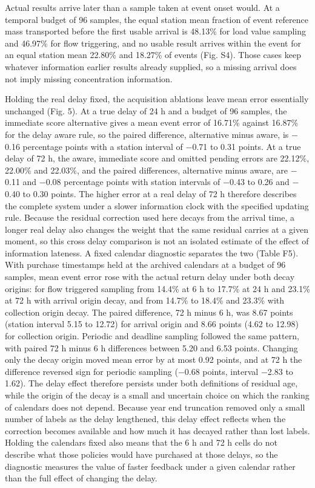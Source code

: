 \documentclass[lineno,pdflatex,sn-apa]{sn-jnl}%
\theoremstyle{thmstyleone}%
\theoremstyle{thmstyletwo}%
\theoremstyle{thmstylethree}%
\begin{document}
Actual results arrive later than a sample taken at event onset would. At a temporal budget of 96 samples, the equal station mean fraction of event reference mass transported before the first usable arrival is 48.13\% for load value sampling and 46.97\% for flow triggering, and no usable result arrives within the event for an equal station mean 22.80\% and 18.27\% of events (Fig. S4). Those cases keep whatever information earlier results already supplied, so a missing arrival does not imply missing concentration information.

Holding the real delay fixed, the acquisition ablations leave mean error essentially unchanged (Fig. 5). At a true delay of 24 h and a budget of 96 samples, the immediate score alternative gives a mean event error of 16.71\% against 16.87\% for the delay aware rule, so the paired difference, alternative minus aware, is $-$0.16 percentage points with a station interval of $-$0.71 to 0.31 points. At a true delay of 72 h, the aware, immediate score and omitted pending errors are 22.12\%, 22.00\% and 22.03\%, and the paired differences, alternative minus aware, are $-$0.11 and $-$0.08 percentage points with station intervals of $-$0.43 to 0.26 and $-$0.40 to 0.30 points. The higher error at a real delay of 72 h therefore describes the complete system under a slower information clock with the specified updating rule. Because the residual correction used here decays from the arrival time, a longer real delay also changes the weight that the same residual carries at a given moment, so this cross delay comparison is not an isolated estimate of the effect of information lateness. A fixed calendar diagnostic separates the two (Table F5). With purchase timestamps held at the archived calendars at a budget of 96 samples, mean event error rose with the actual return delay under both decay origins: for flow triggered sampling from 14.4\% at 6 h to 17.7\% at 24 h and 23.1\% at 72 h with arrival origin decay, and from 14.7\% to 18.4\% and 23.3\% with collection origin decay. The paired difference, 72 h minus 6 h, was 8.67 points (station interval 5.15 to 12.72) for arrival origin and 8.66 points (4.62 to 12.98) for collection origin. Periodic and deadline sampling followed the same pattern, with paired 72 h minus 6 h differences between 5.20 and 6.53 points. Changing only the decay origin moved mean error by at most 0.92 points, and at 72 h the difference reversed sign for periodic sampling ($-$0.68 points, interval $-$2.83 to 1.62). The delay effect therefore persists under both definitions of residual age, while the origin of the decay is a small and uncertain choice on which the ranking of calendars does not depend. Because year end truncation removed only a small number of labels as the delay lengthened, this delay effect reflects when the correction becomes available and how much it has decayed rather than lost labels. Holding the calendars fixed also means that the 6 h and 72 h cells do not describe what those policies would have purchased at those delays, so the diagnostic measures the value of faster feedback under a given calendar rather than the full effect of changing the delay.
\end{document}

